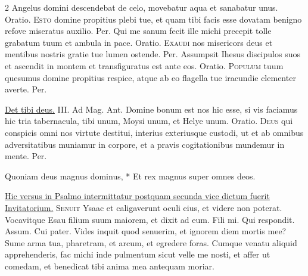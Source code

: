 \begin{multicols*}{2}
 Angelus domini descendebat de celo, movebatur aqua et sanabatur unus. {\color{Red} Oratio.}
\lettrine[lines=2]{\zallmancaps \color{Blue} E}{sto} domine propitius plebi tue, et quam tibi facis esse dovatam benigno refove miseratus auxilio. Per.
 Qui me sanum fecit ille michi precepit tolle grabatum tuum et ambula in pace. {\color{Red} Oratio.}
\lettrine[lines=2]{\zallmancaps \color{Red} E}{xaudi} nos misericors deus et mentibus nostris gratie tue lumen ostende. Per.
 Assumpsit Ihesus discipulos suos et ascendit in montem et transfiguratus est ante eos. {\color{Red} Oratio.}
\lettrine[lines=2]{\zallmancaps \color{Blue} P}{opulum} tuum quesumus domine propitius respice, atque ab eo flagella tue iracundie clementer averte. Per.
{\color{Red} }
\par {} \R \hyperlink{det-tibi-deus}{Det tibi deus.} {\color{Red} III. Ad Mag. Ant.} Domine bonum est nos hic esse, si vis faciamus hic tria tabernacula, tibi unum, Moysi unum, et Helye unum. {\color{Red} Oratio.}
\lettrine[lines=2]{\zallmancaps \color{Red} D}{eus} qui conspicis omni nos virtute destitui, interius exteriusque custodi, ut et ab omnibus adversitatibus muniamur in corpore, et a pravis cogitationibus mundemur in mente. Per.
\begin{invitatory}
{Quoniam deus magnus dominus, * Et rex magnus super omnes deos.}
\end{invitatory}
\newline \ul{Hic versus in Psalmo intermittatur postquam secunda vice dictum fuerit Invitatorium.}
\lettrine[lines=2]{\zallmancaps \color{Blue} S}{enuit} Ysaac et caligaverunt oculi eius, et videre non poterat. Vocavitque Esau filium suum maiorem, et dixit ad eum. Fili mi. Qui respondit. Assum. Cui pater. Vides inquit quod senuerim, et ignorem diem mortis mee? Sume arma tua, pharetram, et arcum, et egredere foras. Cumque venatu aliquid apprehenderis, fac michi inde pulmentum sicut velle me nosti, et affer ut comedam, et benedicat tibi anima mea antequam moriar. \R

\end{multicols*}
